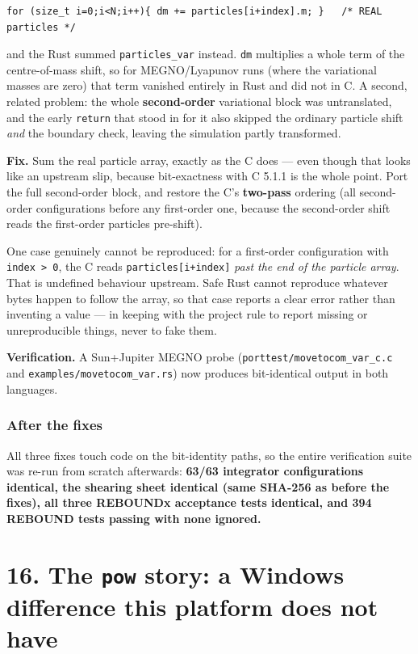 \documentclass[11pt]{article}
\begin{document}
\begin{lstlisting}
for (size_t i=0;i<N;i++){ dm += particles[i+index].m; }   /* REAL particles */
\end{lstlisting}

and the Rust summed \texttt{particles\_var} instead. \texttt{dm} multiplies a whole term of the centre-of-mass shift, so for MEGNO/Lyapunov runs (where the variational masses are zero) that term vanished entirely in Rust and did not in C. A second, related problem: the whole \textbf{second-order} variational block was untranslated, and the early \texttt{return} that stood in for it also skipped the ordinary particle shift \emph{and} the boundary check, leaving the simulation partly transformed.

\textbf{Fix.} Sum the real particle array, exactly as the C does --- even though that looks like an upstream slip, because bit-exactness with C 5.1.1 is the whole point. Port the full second-order block, and restore the C's \textbf{two-pass} ordering (all second-order configurations before any first-order one, because the second-order shift reads the first-order particles pre-shift).

One case genuinely cannot be reproduced: for a first-order configuration with \texttt{index > 0}, the C reads \texttt{particles[i+index]} \emph{past the end of the particle array}. That is undefined behaviour upstream. Safe Rust cannot reproduce whatever bytes happen to follow the array, so that case reports a clear error rather than inventing a value --- in keeping with the project rule to report missing or unreproducible things, never to fake them.

\textbf{Verification.} A Sun+Jupiter MEGNO probe (\texttt{porttest/movetocom\_var\_c.c} and \texttt{examples/movetocom\_var.rs}) now produces bit-identical output in both languages.

\subsubsection{After the fixes}

All three fixes touch code on the bit-identity paths, so the entire verification suite was re-run from scratch afterwards: \textbf{63/63 integrator configurations identical, the shearing sheet identical (same SHA-256 as before the fixes), all three REBOUNDx acceptance tests identical, and 394 REBOUND tests passing with none ignored.}

\section{16. The \texttt{pow} story: a Windows difference this platform does not have}
\end{document}
